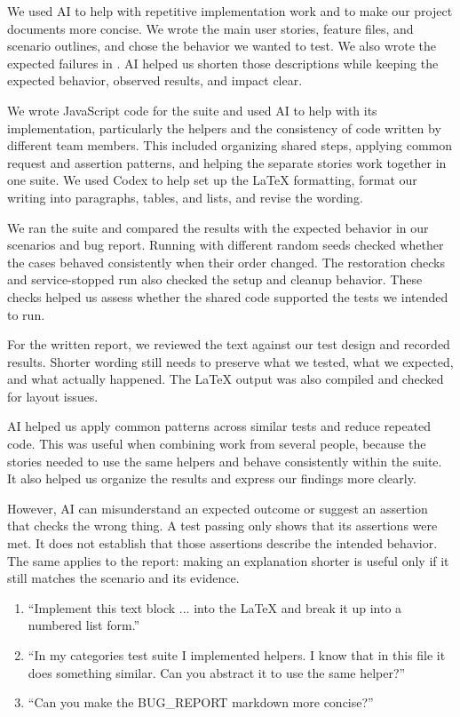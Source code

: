 We used AI to help with repetitive implementation work and to make our project
documents more concise. We wrote the main user stories, feature files, and
scenario outlines, and chose the behavior we wanted to test. We also wrote the
expected failures in . AI helped us shorten those descriptions
while keeping the expected behavior, observed results, and impact clear.

We wrote JavaScript code for the suite and used AI to help with its
implementation, particularly the helpers and the consistency of code written by
different team members. This included organizing shared steps, applying common
request and assertion patterns, and helping the separate stories work together
in one suite. We used Codex to help set up the LaTeX formatting, format our
writing into paragraphs, tables, and lists, and revise the wording.

We ran the suite and compared the results with the expected behavior in our
scenarios and bug report. Running with different random seeds checked whether
the cases behaved consistently when their order changed. The restoration checks
and service-stopped run also checked the setup and cleanup behavior. These checks
helped us assess whether the shared code supported the tests we intended to run.

For the written report, we reviewed the text against our test design and
recorded results. Shorter wording still needs to preserve
what we tested, what we expected, and what actually happened. The LaTeX output
was also compiled and checked for layout issues.

AI helped us apply common patterns across similar tests and reduce repeated
code. This was useful when combining work from several people, because the
stories needed to use the same helpers and behave consistently within the suite.
It also helped us organize the results and express our findings more clearly.

However, AI can misunderstand an expected outcome or suggest an assertion that
checks the wrong thing. A test passing only shows that its assertions were met.
It does not establish that those assertions describe the intended behavior.
The same applies to the report: making an explanation shorter is useful only if
it still matches the scenario and its evidence.

\begin{enumerate}[leftmargin=1.6em,itemsep=6bp,topsep=4bp]
\item ``Implement this text block ... into the LaTeX and break it up into a numbered list form.''
\item ``In my categories test suite I implemented helpers. I know that in this file it does something similar. Can you abstract it to use the same helper?''
\item ``Can you make the BUG\_REPORT markdown more concise?''
\end{enumerate}
